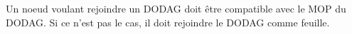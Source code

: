     Un noeud voulant rejoindre un DODAG doit être compatible avec le MOP du DODAG. Si ce n'est pas le cas, il doit rejoindre le DODAG comme feuille.



%
%



